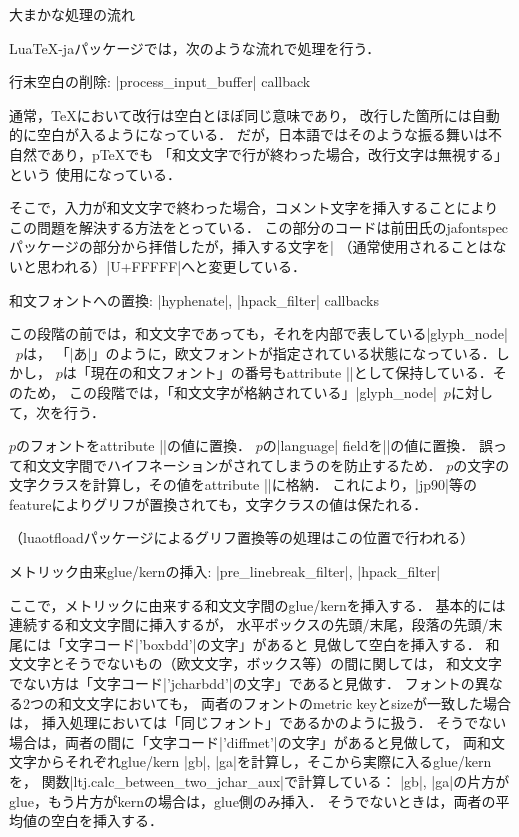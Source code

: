 \beginparagraph 大まかな処理の流れ

Lua\TeX-jaパッケージでは，次のような流れで処理を行う．

\item 行末空白の削除: |process_input_buffer| callback

通常，\TeX において改行は空白とほぼ同じ意味であり，
改行した箇所には自動的に空白が入るようになっている．
だが，日本語ではそのような振る舞いは不自然であり，p\TeX でも
「和文文字で行が終わった場合，改行文字は無視する」という
使用になっている．

そこで，入力が和文文字で終わった場合，コメント文字を挿入することにより
この問題を解決する方法をとっている．
この部分のコードは前田氏のjafontspecパッケージの部分から拝借したが，挿入する文字を|%
（通常使用されることはないと思われる）|U+FFFFF|へと変更している．

\item 和文フォントへの置換: |hyphenate|, |hpack_filter| callbacks

この段階の前では，和文文字であっても，それを内部で表している|glyph_node|~$p$は，
「|\temrm あ|」のように，欧文フォントが指定されている状態になっている．しかし，
$p$は「現在の和文フォント」の番号もattribute |\luatexja@curjfnt|として保持している．そのため，
この段階では，「和文文字が格納されている」|glyph_node|~$p$に対して，次を行う．

\itemitem $p$のフォントをattribute |\luatexja@curjfnt|の値に置換．
\itemitem $p$の|language| fieldを|\luatexja@japanese|の値に置換．
誤って和文文字間でハイフネーションがされてしまうのを防止するため．
\itemitem $p$の文字の文字クラスを計算し，その値をattribute |\luatexja@charclass|に格納．
これにより，|jp90|等のfeatureによりグリフが置換されても，文字クラスの値は保たれる．

\item （luaotfloadパッケージによるグリフ置換等の処理はこの位置で行われる）

\item メトリック由来glue/kernの挿入: |pre_linebreak_filter|, |hpack_filter|

ここで，メトリックに由来する和文文字間のglue/kernを挿入する．
基本的には連続する和文文字間に挿入するが，
\itemitem 水平ボックスの先頭/末尾，段落の先頭/末尾には「文字コード|'boxbdd'|の文字」があると
見做して空白を挿入する．
\itemitem 和文文字とそうでないもの（欧文文字，ボックス等）の間に関しては，
和文文字でない方は「文字コード|'jcharbdd'|の文字」であると見做す．
\itemitem フォントの異なる2つの和文文字においても，
両者のフォントのmetric keyとsizeが一致した場合は，
挿入処理においては「同じフォント」であるかのように扱う．
\itemitem  そうでない場合は，両者の間に「文字コード|'diffmet'|の文字」があると見做して，
両和文文字からそれぞれglue/kern |gb|, |ga|を計算し，そこから実際に入るglue/kernを，
関数|ltj.calc_between_two_jchar_aux|で計算している：
\itemT |gb|, |ga|の片方がglue，もう片方がkernの場合は，glue側のみ挿入．
\itemT そうでないときは，両者の平均値の空白を挿入する．

